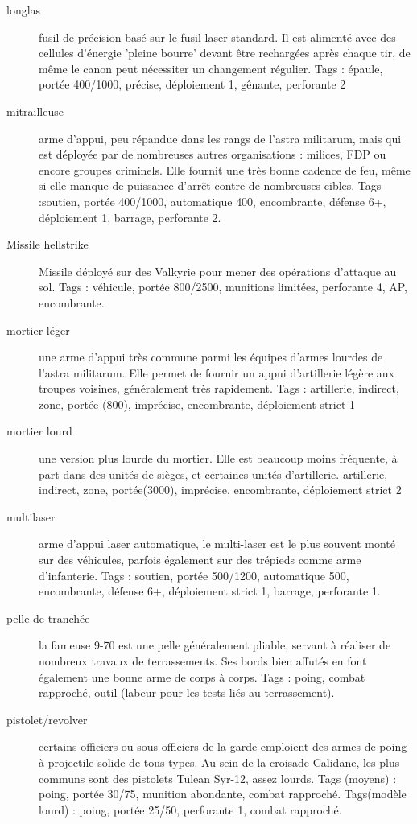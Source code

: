 \documentclass[10pt,a4paper]{article}
\begin{document}
\begin{description}
\item[longlas ] fusil de précision basé sur le fusil laser standard. Il est alimenté avec des cellules d'énergie 'pleine bourre' devant être rechargées après chaque tir, de même le canon peut nécessiter un changement régulier. Tags : épaule, portée 400/1000, précise, déploiement 1, gênante, perforante 2
\item[mitrailleuse ]arme d'appui, peu répandue dans les rangs de l'astra militarum, mais qui est déployée par de nombreuses autres organisations : milices, FDP ou encore groupes criminels. Elle fournit une très bonne cadence de feu, même si elle manque de puissance d'arrêt contre de nombreuses cibles. Tags :soutien, portée 400/1000, automatique 400, encombrante, défense 6+, déploiement 1, barrage, perforante 2.
\item[Missile hellstrike]Missile déployé sur des Valkyrie pour mener des opérations d'attaque au sol. Tags : véhicule, portée 800/2500, munitions limitées, perforante 4, AP, encombrante.
\item[mortier léger ]une arme d'appui très commune parmi les équipes d'armes lourdes de l'astra militarum. Elle permet de fournir un appui d'artillerie légère aux troupes voisines, généralement très rapidement. Tags : artillerie, indirect, zone, portée (800), imprécise, encombrante, déploiement strict 1
\item[mortier lourd]une version plus lourde du mortier. Elle est beaucoup moins fréquente, à part dans des unités de sièges, et certaines unités d'artillerie. artillerie, indirect, zone, portée(3000), imprécise, encombrante, déploiement strict 2
\item[multilaser]arme d'appui laser automatique, le multi-laser est le plus souvent monté sur des véhicules, parfois également sur des trépieds comme arme d'infanterie. Tags : soutien, portée 500/1200, automatique 500, encombrante, défense 6+, déploiement strict 1, barrage, perforante 1.
\item[pelle de tranchée]la fameuse 9-70 est une pelle généralement pliable, servant à réaliser de nombreux travaux de terrassements. Ses bords bien affutés en font également une bonne arme de corps à corps. Tags : poing, combat rapproché, outil (labeur pour les tests liés au terrassement).
\item[pistolet/revolver]certains officiers ou sous-officiers de la garde emploient des armes de poing à projectile solide de tous types. Au sein de la croisade Calidane, les plus communs sont des pistolets Tulean Syr-12, assez lourds. Tags (moyens) : poing, portée 30/75, munition abondante, combat rapproché. Tags(modèle lourd) : poing, portée 25/50, perforante 1, combat rapproché.

\end{description}
\end{document}
